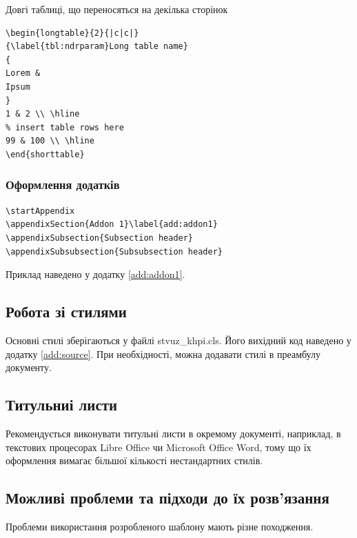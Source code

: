 Довгі таблиці, що переносяться на декілька сторінок

\begin{framed}\small
\begin{lstlisting}
\begin{longtable}{2}{|c|c|}
{\label{tbl:ndrparam}Long table name}
{
Lorem &
Ipsum
}
1 & 2 \\ \hline
% insert table rows here 
99 & 100 \\ \hline
\end{shorttable}
\end{lstlisting}
\end{framed}

\subsubsection{Оформлення додатків}

\begin{framed}
\begin{lstlisting}
\startAppendix
\appendixSection{Addon 1}\label{add:addon1} 
\appendixSubsection{Subsection header}
\appendixSubsubsection{Subsubsection header}
\end{lstlisting}
\end{framed}

Приклад наведено у додатку \ref{add:addon1}.

\subsection{Робота зі стилями}

Основні стилі зберігаються у файлі stvuz\_khpi.cls.
Його вихідний код наведено у додатку \ref{add:source}. При необхідності, можна
додавати стилі в преамбулу документу.

\subsection{Титульниі листи}

Рекомендується виконувати титульні листи в окремому документі, наприклад, в
текстових процесорах Libre Office чи Microsoft Office Word, тому що їх
оформлення вимагає більшої кількості нестандартних стилів.

\subsection{Можливі проблеми та підходи до їх розв'язання}

Проблеми використання розробленого шаблону мають різне походження.

